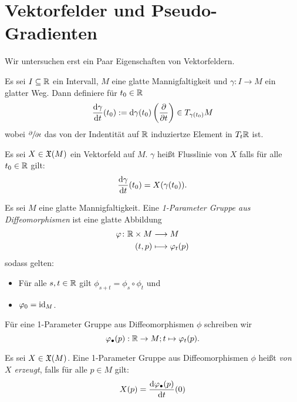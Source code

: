 \section{Vektorfelder und Pseudo-Gradienten}

Wir untersuchen erst ein Paar Eigenschaften von Vektorfeldern.

\begin{definition}[Flusslinie]
    \label{def: flussliene}
    Es sei $I \subseteq { \mathbb R }$ ein Intervall, $M$ eine glatte Mannigfaltigkeit und  
    $\gamma \colon I  \to M$ ein glatter Weg. Dann definiere für $t_0 \in { \mathbb R }$
    \[ \derive[\gamma]{t} (t_0) := 
        \opd \gamma (t_0) \left( \pderive{t} \right) \in T_{\gamma(t_0)}M \]
    wobei $\pderive{t}$ das von der Indentität auf ${ \mathbb R }$ induziertze Element in $T_t{ \mathbb R }$ ist.

    Es sei $X \in { \mathfrak{X} } (M)$ ein Vektorfeld auf $M$. $\gamma$ heißt Flusslinie von $X$
    falls für alle $t_0 \in { \mathbb R }$ gilt: 
    \[ \derive[\gamma]{t}(t_0) = X(\gamma(t_0)) . \]
\end{definition}

\begin{definition}
    \label{def: 1-parameter gruppe aus diffeos}
    Es sei $M$ eine glatte Mannigfaltigkeit. Eine 
    \textit{1-Parameter Gruppe aus Diffeomorphismen} ist eine glatte Abbildung
    \begin{align*}
        \varphi \colon { \mathbb R } \times M \longrightarrow & \; M \\
        (t, p) \longmapsto & \; \varphi_t(p)
    \end{align*}
    sodass gelten: 
    \begin{itemize}
        \item Für alle $s, t \in { \mathbb R }$ gilt $\phi_{s + t} = \phi_s \circ \phi_t$ und
        \item $\varphi_0 = { \operatorname{id} }_{M}$.
    \end{itemize}

    Für eine 1-Parameter Gruppe aus Diffeomorphismen $\phi$ schreiben wir 
    \[ \varphi_{\bullet}(p): { \mathbb R } \to M ; t \mapsto \varphi_t(p) . \]

    Es sei $X \in { \mathfrak{X} } (M)$. Eine 1-Parameter Gruppe aus Diffeomorphismen $\phi$ heißt 
    \textit{von $X$ erzeugt}, falls für alle $p \in M$ gilt:
    \[ X(p) = \derive[\phi_{\bullet}(p)]{t}(0) \]
\end{definition}

